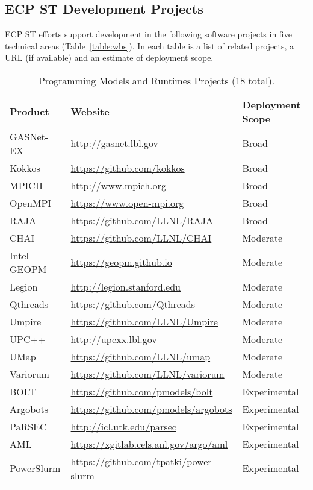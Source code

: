 \subsection{ECP ST Development Projects}\label{subsect:projects}
 ECP ST efforts support development in the following software projects in five technical areas (Table~\ref{table:wbs}). In each table is a list of related projects, a URL (if available) and an estimate of deployment scope.

\begin{table}
	\begin{tabular}{|l|l|l|}\hline
		\rowcolor{LightCyan}
		\textbf{Product} & \textbf{Website} & \textbf{Deployment Scope}\\\hline
		GASNet-EX & \url{http://gasnet.lbl.gov} & Broad\\\hline
		Kokkos & \url{https://github.com/kokkos} & Broad\\\hline
		MPICH & \url{http://www.mpich.org} & Broad\\\hline
		OpenMPI & \url{https://www.open-mpi.org} & Broad\\\hline
		RAJA & \url{https://github.com/LLNL/RAJA} & Broad\\\hline

		CHAI & \url{https://github.com/LLNL/CHAI} & Moderate\\\hline
		Intel GEOPM & \url{https://geopm.github.io} & Moderate\\\hline
		Legion & \url{http://legion.stanford.edu} & Moderate\\\hline
		Qthreads & \url{https://github.com/Qthreads} & Moderate\\\hline
		Umpire & \url{https://github.com/LLNL/Umpire} & Moderate\\\hline
		UPC++ & \url{http://upcxx.lbl.gov} & Moderate\\\hline
		UMap & \url{https://github.com/LLNL/umap} & Moderate\\\hline
		Variorum & \url{https://github.com/LLNL/variorum} & Moderate\\\hline

		BOLT & \url{https://github.com/pmodels/bolt} & Experimental\\\hline
		Argobots & \url{https://github.com/pmodels/argobots} & Experimental\\\hline
		PaRSEC & \url{http://icl.utk.edu/parsec} & Experimental\\\hline
		AML & \url{https://xgitlab.cels.anl.gov/argo/aml} & Experimental\\\hline
		PowerSlurm & \url{https://github.com/tpatki/power-slurm} & Experimental\\\hline
	\end{tabular}
\caption{\label{table:pmr-products} Programming Models and Runtimes Projects (18 total).}
\end{table}

